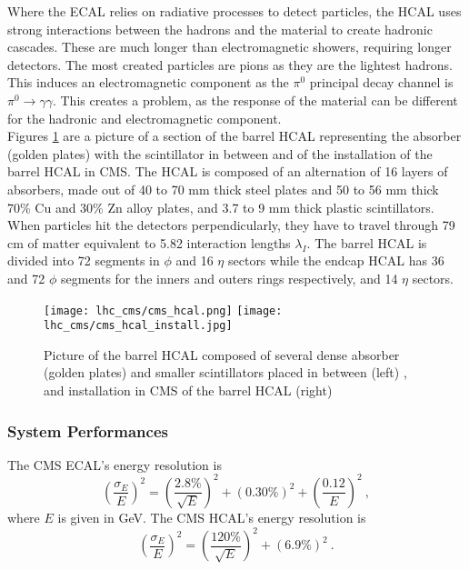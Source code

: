                 Where the ECAL relies on radiative processes to detect particles, the HCAL uses strong interactions between the hadrons and the material to create hadronic cascades. These are much longer than electromagnetic showers, requiring longer detectors. The most created particles are pions as they are the lightest hadrons. This induces an electromagnetic component as the $ \pi^0 $ principal decay channel is $ \pi^0 \rightarrow \gamma \gamma $. This creates a problem, as the response of the material can be different for the hadronic and electromagnetic component. \\

                Figures \ref{fig:lhc_and_cms__cms_hcal_view} are a picture of a section of the barrel HCAL representing the absorber (golden plates) with the scintillator in between and of the installation of the barrel HCAL in CMS. The HCAL is composed of an alternation of 16 layers of absorbers, made out of 40 to 70 mm thick steel plates and 50 to 56 mm thick 70\% Cu and 30\% Zn alloy plates, and 3.7 to 9 mm thick plastic scintillators. When particles hit the detectors perpendicularly, they have to travel through 79 cm of matter equivalent to 5.82 interaction lengths $ \lambda_I $. The barrel HCAL is divided into 72 segments in $ \phi $ and 16 $ \eta $ sectors while the endcap HCAL has 36 and 72 $ \phi $ segments for the inners and outers rings respectively, and 14 $ \eta $ sectors.

                \begin{figure}[h!]
                    \centering
                    \texttt{[image: lhc\_cms/cms\_hcal.png]}
                    \texttt{[image: lhc\_cms/cms\_hcal\_install.jpg]}
                    \caption{Picture of the barrel HCAL composed of several dense absorber (golden plates) and smaller scintillators placed in between (left) \Cite{CMS_at_LHC}, and installation in CMS of the barrel HCAL (right) \Cite{CMS_HCAL_Install}}
                    \label{fig:lhc_and_cms__cms_hcal_view}
                \end{figure}    

            \subsubsection{System Performances}  
            \label{sec:lhc_and_cms__calorimeters_system_performances}   

                The CMS ECAL's energy resolution is \Cite{CMS_Performances}
                \begin{equation}
                    \left( \frac{\sigma_E}{E} \right)^2 = \left( \frac{2.8\%}{\sqrt{E}} \right)^2 + \left( 0.30\% \right)^2 + \left( \frac{0.12}{E} \right)^2 \ ,
                \end{equation}      
                where $ E $ is given in GeV. The CMS HCAL's energy resolution is
                \begin{equation}
                    \left( \frac{\sigma_E}{E} \right)^2 = \left( \frac{120\%}{\sqrt{E}} \right)^2 + \left( 6.9\% \right)^2 \ .
                \end{equation}      

